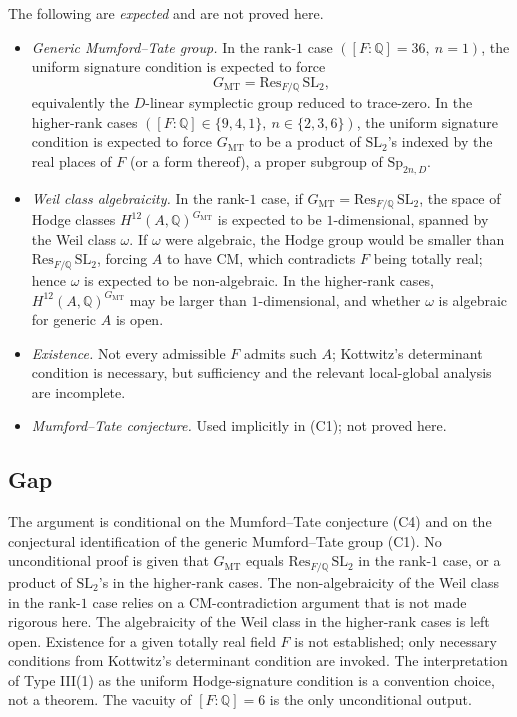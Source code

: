 \documentclass{article}
\begin{document}
The following are \emph{expected} and are not proved here.

\begin{itemize}
  \item[(C1)] \emph{Generic Mumford--Tate group.} In the rank-$1$ case $([F:\mathbb{Q}]=36,\ n=1)$, the uniform signature condition is expected to force
  \[
  G_{\mathrm{MT}} = \mathrm{Res}_{F/\mathbb{Q}}\,\mathrm{SL}_2,
  \]
  equivalently the $D$-linear symplectic group reduced to trace-zero. In the higher-rank cases $([F:\mathbb{Q}] \in \{9,4,1\},\ n \in \{2,3,6\})$, the uniform signature condition is expected to force $G_{\mathrm{MT}}$ to be a product of $\mathrm{SL}_2$'s indexed by the real places of $F$ (or a form thereof), a proper subgroup of $\mathrm{Sp}_{2n,D}$.
  \item[(C2)] \emph{Weil class algebraicity.} In the rank-$1$ case, if $G_{\mathrm{MT}} = \mathrm{Res}_{F/\mathbb{Q}}\,\mathrm{SL}_2$, the space of Hodge classes $H^{12}(A,\mathbb{Q})^{G_{\mathrm{MT}}}$ is expected to be $1$-dimensional, spanned by the Weil class $\omega$. If $\omega$ were algebraic, the Hodge group would be smaller than $\mathrm{Res}_{F/\mathbb{Q}}\,\mathrm{SL}_2$, forcing $A$ to have CM, which contradicts $F$ being totally real; hence $\omega$ is expected to be non-algebraic. In the higher-rank cases, $H^{12}(A,\mathbb{Q})^{G_{\mathrm{MT}}}$ may be larger than $1$-dimensional, and whether $\omega$ is algebraic for generic $A$ is open.
  \item[(C3)] \emph{Existence.} Not every admissible $F$ admits such $A$; Kottwitz's determinant condition is necessary, but sufficiency and the relevant local-global analysis are incomplete.
  \item[(C4)] \emph{Mumford--Tate conjecture.} Used implicitly in (C1); not proved here.
\end{itemize}

\subsection*{Gap}

The argument is conditional on the Mumford--Tate conjecture (C4) and on the conjectural identification of the generic Mumford--Tate group (C1). No unconditional proof is given that $G_{\mathrm{MT}}$ equals $\mathrm{Res}_{F/\mathbb{Q}}\,\mathrm{SL}_2$ in the rank-$1$ case, or a product of $\mathrm{SL}_2$'s in the higher-rank cases. The non-algebraicity of the Weil class in the rank-$1$ case relies on a CM-contradiction argument that is not made rigorous here. The algebraicity of the Weil class in the higher-rank cases is left open. Existence for a given totally real field $F$ is not established; only necessary conditions from Kottwitz's determinant condition are invoked. The interpretation of Type III(1) as the uniform Hodge-signature condition is a convention choice, not a theorem. The vacuity of $[F:\mathbb{Q}]=6$ is the only unconditional output.
\end{document}
